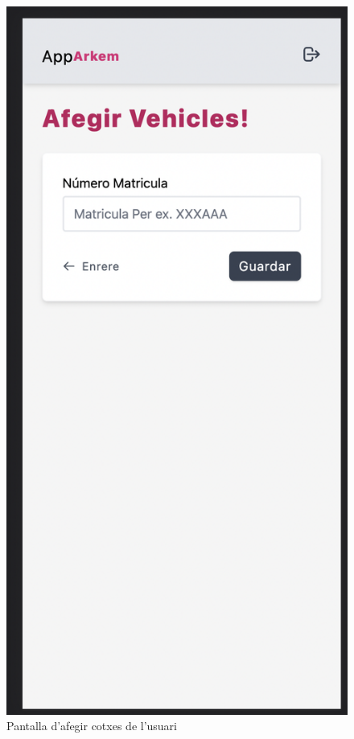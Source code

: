 \begin{figure}[H]
    \begin{center}
        \includegraphics[scale=0.50]{Fotos/pantalla11_add_car.png}
    \end{center}
    \caption{Pantalla d'afegir cotxes de l'usuari}
    \label{fig:add_car_photo}
\end{figure}


